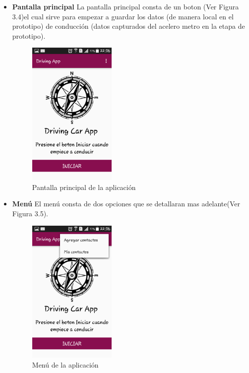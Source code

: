 \begin{itemize}
\item \textbf{Pantalla principal}
La pantalla principal consta de un boton (Ver Figura 3.4)el cual sirve para empezar a guardar los datos (de manera local en el prototipo) de conducción (datos capturados del acelero metro en la etapa de prototipo).
\begin{figure}[h!]
  \begin{center}	\includegraphics[width=0.4\textwidth]{imagenes/principal}
  \caption{Pantalla principal de la aplicación}
  \end{center}
\end{figure}
\item \textbf{Menú}
El menú consta de dos opciones que se detallaran mas adelante(Ver Figura 3.5).
\begin{figure}[h!]
  \begin{center}	\includegraphics[width=0.4\textwidth]{imagenes/menu}
  \caption{Menú de la aplicación}
  \end{center}
\end{figure}


\end{itemize}
